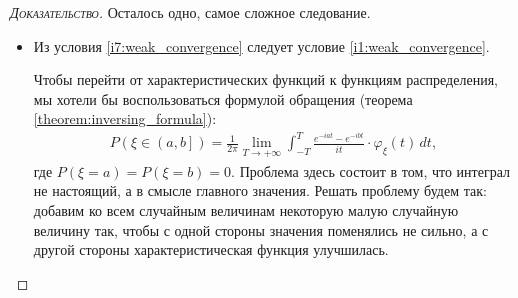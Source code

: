 \documentclass[../main.tex]{subfiles}
\begin{document}
\begin{proof}[\normalfont\textsc{Доказательство}]
 Осталось одно, самое сложное следование.

 \begin{itemize}
  \item Из условия \ref{i7:weak_convergence} следует условие \ref{i1:weak_convergence}. 

   Чтобы перейти от характеристических функций к функциям распределения, мы хотели бы воспользоваться формулой обращения (теорема \ref{theorem:inversing_formula}):
   \begin{align*}
    P(\xi \in \left(a, b\right]) = \frac{1}{2\pi} \lim_{T \to +\infty} \int_{-T}^{T} \frac{e^{-iat}-e^{-ibt}}{it} \cdot \varphi_\xi(t)\,dt,
   \end{align*} где $ P(\xi=a)=P(\xi=b)=0 $. Проблема здесь состоит в том, что интеграл не настоящий, а в смысле главного значения. Решать проблему будем так: добавим ко всем случайным величинам некоторую малую случайную величину так, чтобы с одной стороны значения поменялись не сильно, а с другой стороны характеристическая функция улучшилась.


\end{itemize}
\end{proof}
\end{document}
